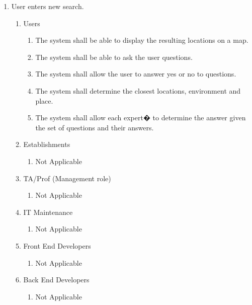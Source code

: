 \documentclass[titlepage]{article}
\begin{document}
		\begin{enumerate}[{BE1}]
			
			\item User enters new search.
			\begin{enumerate}[{VP1.1}]
				
				\item Users
				\begin{enumerate}
					\item The system shall be able to display the resulting locations on a map.
					\item The system shall be able to ask the user questions.
					\item The system shall allow the user to answer yes or no to questions.
					\item The system shall determine the closest locations, environment and place.
					\item The system shall allow each expert� to determine the answer given the set of questions and their answers.
				\end{enumerate}
				
				\item Establishments
				\begin{enumerate}
					\item Not Applicable
				\end{enumerate}
				
				\item TA/Prof (Management role)
				\begin{enumerate}
					\item Not Applicable
				\end{enumerate}
				
				\item IT Maintenance
				\begin{enumerate}
					\item Not Applicable
				\end{enumerate}
				
				\item Front End Developers
				\begin{enumerate}
					\item Not Applicable
				\end{enumerate}
				
				\item Back End Developers
				\begin{enumerate}
					\item Not Applicable
				\end{enumerate}
			\end{enumerate}
			

\end{enumerate}
\end{document}
